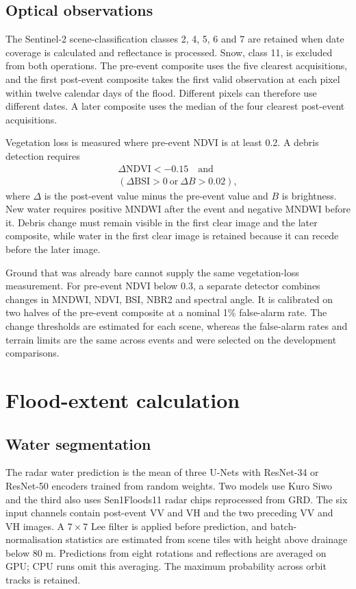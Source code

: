 \documentclass[10pt,twocolumn,letterpaper]{article}
\begin{document}
\subsection{Optical observations}
The Sentinel-2 scene-classification classes 2, 4, 5, 6 and 7 are retained when date coverage is
calculated and reflectance is processed. Snow, class 11, is excluded from both operations. The
pre-event composite uses the five clearest acquisitions, and the first post-event composite takes
the first valid observation at each pixel within twelve calendar days of the flood. Different pixels
can therefore use different dates. A later composite uses the median of the four clearest post-event
acquisitions.

Vegetation loss is measured where pre-event NDVI is at least 0.2. A debris detection requires
\begin{equation}
\begin{gathered}
\Delta\mathrm{NDVI} < -0.15\quad\text{and}\\
\left(\Delta\mathrm{BSI}>0\ \text{or}\ \Delta B>0.02\right),
\end{gathered}
\label{eq:debris}
\end{equation}
where $\Delta$ is the post-event value minus the pre-event value and $B$ is brightness. New water
requires positive MNDWI after the event and negative MNDWI before it. Debris change must remain
visible in the first clear image and the later composite, while water in the first clear image is
retained because it can recede before the later image.

Ground that was already bare cannot supply the same vegetation-loss measurement. For pre-event NDVI
below 0.3, a separate detector combines changes in MNDWI, NDVI, BSI, NBR2 and spectral angle. It is
calibrated on two halves of the pre-event composite at a nominal 1\% false-alarm rate. The change
thresholds are estimated for each scene, whereas the false-alarm rates and terrain limits are the
same across events and were selected on the development comparisons.

\section{Flood-extent calculation}
\subsection{Water segmentation}
The radar water prediction is the mean of three U-Nets with ResNet-34 or ResNet-50 encoders trained
from random weights. Two models use Kuro Siwo and the third also uses Sen1Floods11 radar chips
reprocessed from GRD. The six input channels contain post-event VV and VH and the two preceding VV
and VH images. A $7\times7$ Lee filter is applied before prediction, and batch-normalisation
statistics are estimated from scene tiles with height above drainage below 80 m. Predictions from
eight rotations and reflections are averaged on GPU; CPU runs omit this averaging. The maximum
probability across orbit tracks is retained.
\end{document}
